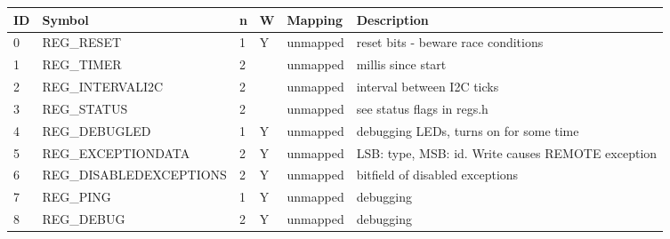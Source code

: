 \begin{tabular}{|p{0.2in}|p{2.7in}|p{0.1in}|p{0.1in}|p{1in}|p{1.5in}|}\hline
\textbf{ID} & \textbf{Symbol} & \textbf{n} & \textbf{W} & \textbf{Mapping} & \textbf{Description}  \\ \hline 
0 & REG\_RESET & 1 & Y & unmapped & reset bits - beware race conditions\\ \hline
1 & REG\_TIMER & 2 &  & unmapped & millis since start\\ \hline
2 & REG\_INTERVALI2C & 2 &  & unmapped & interval between I2C ticks\\ \hline
3 & REG\_STATUS & 2 &  & unmapped & see status flags in regs.h\\ \hline
4 & REG\_DEBUGLED & 1 & Y & unmapped & debugging LEDs, turns on for some time\\ \hline
5 & REG\_EXCEPTIONDATA & 2 & Y & unmapped & LSB: type, MSB: id. Write causes REMOTE exception\\ \hline
6 & REG\_DISABLEDEXCEPTIONS & 2 & Y & unmapped & bitfield of disabled exceptions\\ \hline
7 & REG\_PING & 1 & Y & unmapped & debugging\\ \hline
8 & REG\_DEBUG & 2 & Y & unmapped & debugging\\ \hline
\end{tabular}


